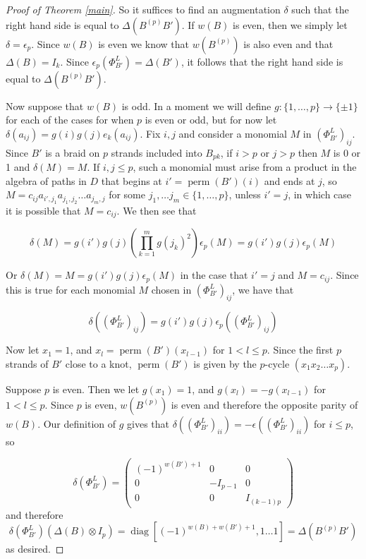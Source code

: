 \documentclass{amsart}[11pt,fullpage]
\newcommand\diag{\operatorname{diag}}
\newcommand\perm{\operatorname{perm}}
\theoremstyle{definition}
\begin{document}
\begin{proof}[Proof of Theorem \ref{main}]
So it suffices to find an augmentation $\delta$ such that the right hand side is equal to $\Delta(B^{(p)}B')$. If $w(B)$ is even, then we simply let $\delta = \epsilon_p$. Since $w(B)$ is even we know that $w(B^{(p)})$ is also even and that $\Delta(B) = I_k$. Since $\epsilon_p\left(\Phi_{B'}^L\right) = \Delta(B')$, it follows that the right hand side is equal to $\Delta(B^{(p)}B')$.

Now suppose that $w(B)$ is odd. In a moment we will define $g\colon \{1,\ldots,p\}\rightarrow \{\pm 1\}$ for each of the cases for when $p$ is even or odd, but for now let $\delta(a_{ij}) = g(i)g(j)e_k(a_{ij})$. Fix $i,j$ and consider a monomial $M$ in $\left(\Phi_{B'}^L\right)_{ij}$. Since $B'$ is a braid on $p$ strands included into $B_{pk}$, if $i>p$ or $j>p$ then $M$ is 0 or 1 and $\delta(M) = M$. If $i,j\le p$, such a monomial must arise from a product in the algebra of paths in $D$ that begins at $i' = \perm(B')(i)$ and ends at $j$, so $M=c_{ij}a_{i',j_1}a_{j_1,j_2}\ldots a_{j_m,j}$ for some $j_1,\ldots j_m\in \{1,\ldots,p\}$, unless $i' = j$, in which case it is possible that $M=c_{ij}$. We then see that 

$$\delta(M) = g(i')g(j)\left(\prod_{k=1}^m g(j_k)^2\right)\epsilon_p(M) = g(i')g(j)\epsilon_p(M)$$

\noindent Or $\delta(M) = M = g(i')g(j)\epsilon_p(M)$ in the case that $i'=j$ and $M=c_{ij}$. Since this is true for each monomial $M$ chosen in $\left(\Phi_{B'}^L\right)_{ij}$, we have that

$$\delta\left(\left(\Phi_{B'}^L\right)_{ij}\right) = g(i')g(j)\epsilon_p\left(\left(\Phi_{B'}^L\right)_{ij}\right)$$

Now let $x_1 = 1$, and $x_l = \perm(B')(x_{l-1})$ for $1<l\le p$. Since the first $p$ strands of $B'$ close to a knot, $\perm(B')$ is given by the $p$-cycle $(x_1x_2\ldots x_p)$.

Suppose $p$ is even. Then we let $g(x_1) = 1$, and $g(x_l) = -g(x_{l-1})$ for $1<l\le p$. Since $p$ is even, $w(B^{(p)})$ is even and therefore the opposite parity of $w(B)$. Our definition of $g$ gives that $\delta\left(\left(\Phi_{B'}^L\right)_{ii}\right) = -\epsilon\left(\left(\Phi_{B'}^L\right)_{ii}\right)$ for $i\le p$, so 

$$\delta\left(\Phi_{B'}^L\right) = 
\left( \begin{array}{ccc}
(-1)^{w(B')+1} & 0 & 0 \\
0 & -I_{p-1} & 0 \\
0 & 0 & I_{(k-1)p} \end{array} \right)
$$
\noindent and therefore
$$
\delta\left(\Phi_{B'}^L\right)\left(\Delta(B)\otimes I_p\right) = \diag[(-1)^{w(B) + w(B') + 1},1\ldots 1] = \Delta(B^{(p)}B')
$$
\noindent as desired.


\end{proof}
\end{document}
